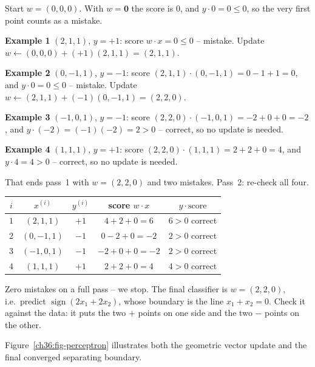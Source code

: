 Start $w=(0,0,0)$. With $w=\mathbf 0$ the score is $0$, and $y\cdot 0 = 0 \le 0$,
so the very first point counts as a mistake.

\textbf{Example 1} $(2,1,1)$, $y=+1$: score $w\cdot x = 0 \le 0$ -- mistake.
Update $w \leftarrow (0,0,0) + (+1)(2,1,1) = (2,1,1)$.

\textbf{Example 2} $(0,-1,1)$, $y=-1$: score
$(2,1,1)\cdot(0,-1,1) = 0 - 1 + 1 = 0$, and $y\cdot 0 = 0 \le 0$ -- mistake.
Update $w \leftarrow (2,1,1) + (-1)(0,-1,1) = (2,2,0)$.

\textbf{Example 3} $(-1,0,1)$, $y=-1$: score
$(2,2,0)\cdot(-1,0,1) = -2 + 0 + 0 = -2$, and $y\cdot(-2) = (-1)(-2) = 2 > 0$ --
correct, so no update is needed.

\textbf{Example 4} $(1,1,1)$, $y=+1$: score
$(2,2,0)\cdot(1,1,1) = 2 + 2 + 0 = 4$, and $y\cdot 4 = 4 > 0$ -- correct, so no
update is needed.

That ends pass~1 with $w=(2,2,0)$ and two mistakes. Pass~2: re-check all four.

\begin{center}
\begin{tabular}{ccccc}
\toprule
$i$ & $x^{(i)}$ & $y^{(i)}$ & score $w\cdot x$ & $y\cdot\text{score}$ \\
\midrule
$1$ & $(2,1,1)$ & $+1$ & $4+2+0=6$ & $6>0$ correct \\
$2$ & $(0,-1,1)$ & $-1$ & $0-2+0=-2$ & $2>0$ correct \\
$3$ & $(-1,0,1)$ & $-1$ & $-2+0+0=-2$ & $2>0$ correct \\
$4$ & $(1,1,1)$ & $+1$ & $2+2+0=4$ & $4>0$ correct \\
\bottomrule
\end{tabular}
\end{center}

Zero mistakes on a full pass -- we stop. The final classifier is
$w=(2,2,0)$, i.e.\ predict $\operatorname{sign}(2x_1 + 2x_2)$, whose boundary is
the line $x_1 + x_2 = 0$. Check it against the data: it puts the two
$+$ points on one side and the two $-$ points on the other.

Figure~\ref{ch36:fig-perceptron} illustrates both the geometric vector update
and the final converged separating boundary.

